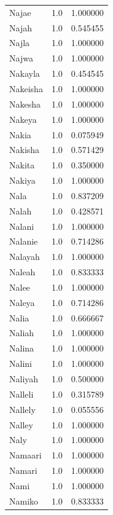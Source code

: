 \documentclass[
  letterpaper,
  DIV=11,
  numbers=noendperiod]{scrreprt}
\begin{document}
\begin{tabular}{lrr}
Najae           &   1.0 &   1.000000 \\
Najah           &   1.0 &   0.545455 \\
Najla           &   1.0 &   1.000000 \\
Najwa           &   1.0 &   1.000000 \\
Nakayla         &   1.0 &   0.454545 \\
Nakeisha        &   1.0 &   1.000000 \\
Nakesha         &   1.0 &   1.000000 \\
Nakeya          &   1.0 &   1.000000 \\
Nakia           &   1.0 &   0.075949 \\
Nakisha         &   1.0 &   0.571429 \\
Nakita          &   1.0 &   0.350000 \\
Nakiya          &   1.0 &   1.000000 \\
Nala            &   1.0 &   0.837209 \\
Nalah           &   1.0 &   0.428571 \\
Nalani          &   1.0 &   1.000000 \\
Nalanie         &   1.0 &   0.714286 \\
Nalayah         &   1.0 &   1.000000 \\
Naleah          &   1.0 &   0.833333 \\
Nalee           &   1.0 &   1.000000 \\
Naleya          &   1.0 &   0.714286 \\
Nalia           &   1.0 &   0.666667 \\
Naliah          &   1.0 &   1.000000 \\
Nalina          &   1.0 &   1.000000 \\
Nalini          &   1.0 &   1.000000 \\
Naliyah         &   1.0 &   0.500000 \\
Nalleli         &   1.0 &   0.315789 \\
Nallely         &   1.0 &   0.055556 \\
Nalley          &   1.0 &   1.000000 \\
Naly            &   1.0 &   1.000000 \\
Namaari         &   1.0 &   1.000000 \\
Namari          &   1.0 &   1.000000 \\
Nami            &   1.0 &   1.000000 \\
Namiko          &   1.0 &   0.833333 \\

\end{tabular}
\end{document}

